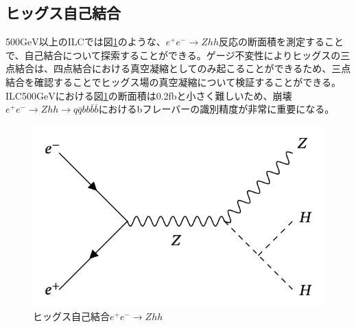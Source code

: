 \subsection{ヒッグス自己結合}
500$\mathrm{GeV}$以上のILCでは図\ref{selfcoupling}のような、$e^+e^- \rightarrow Zhh$反応の断面積を測定することで、自己結合について探索することができる。ゲージ不変性によりヒッグスの三点結合は、四点結合における真空凝縮としてのみ起こることができるため、三点結合を確認することでヒッグス場の真空凝縮について検証することができる。ILC500$\mathrm{GeV}$における図\ref{selfcoupling}の断面積は0.2fbと小さく難しいため、崩壊$e^+e^- \rightarrow Zhh \rightarrow q\bar{q}bb\bar{b}\bar{b}$におけるbフレーバーの識別精度が非常に重要になる。
\begin{figure}[h]
	\begin{center}
 \includegraphics[keepaspectratio, scale=0.4]
 	{Figure/Introduction/selfcoupling.png}
 		\caption{ヒッグス自己結合$e^+e^- \rightarrow Zhh$}
 		\label{selfcoupling}
	\end{center}
\end{figure}
